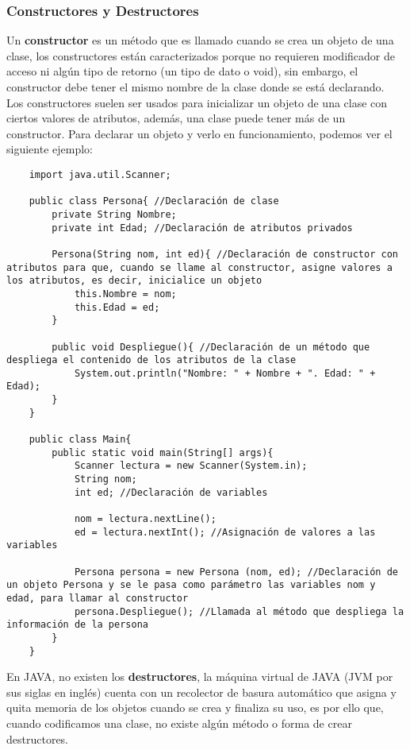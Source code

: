 \subsubsection{Constructores y Destructores}
Un \textbf{constructor} es un método que es llamado cuando se crea un objeto de una clase, los constructores están caracterizados porque no requieren modificador de acceso ni algún tipo de retorno (un tipo de dato o void), sin embargo, el constructor debe tener el mismo nombre de la clase donde se está declarando.\\
Los constructores suelen ser usados para inicializar un objeto de una clase con ciertos valores de atributos, además, una clase puede tener más de un constructor. Para declarar un objeto y verlo en funcionamiento, podemos ver el siguiente ejemplo:
\begin{lstlisting}
    import java.util.Scanner;
    
    public class Persona{ //Declaración de clase
        private String Nombre;
        private int Edad; //Declaración de atributos privados
        
        Persona(String nom, int ed){ //Declaración de constructor con atributos para que, cuando se llame al constructor, asigne valores a los atributos, es decir, inicialice un objeto
            this.Nombre = nom;
            this.Edad = ed;
        }
        
        public void Despliegue(){ //Declaración de un método que despliega el contenido de los atributos de la clase
            System.out.println("Nombre: " + Nombre + ". Edad: " + Edad);
        }
    }
    
    public class Main{
        public static void main(String[] args){
            Scanner lectura = new Scanner(System.in);
            String nom;
            int ed; //Declaración de variables
            
            nom = lectura.nextLine();
            ed = lectura.nextInt(); //Asignación de valores a las variables
            
            Persona persona = new Persona (nom, ed); //Declaración de un objeto Persona y se le pasa como parámetro las variables nom y edad, para llamar al constructor
            persona.Despliegue(); //Llamada al método que despliega la información de la persona
        }
    }
\end{lstlisting}
En JAVA, no existen los \textbf{destructores}, la máquina virtual de JAVA (JVM por sus siglas en inglés) cuenta con un recolector de basura automático que asigna y quita memoria de los objetos cuando se crea y finaliza su uso, es por ello que, cuando codificamos una clase, no existe algún método o forma de crear destructores.

